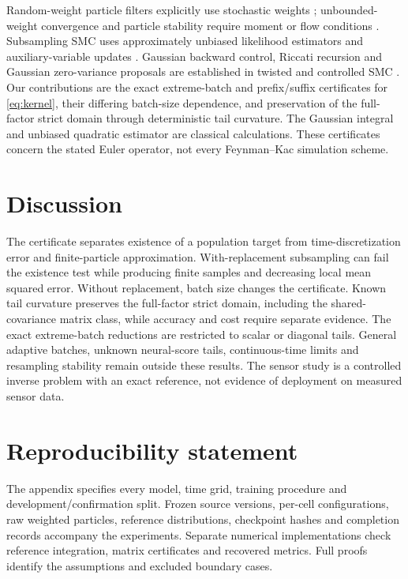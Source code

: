 \documentclass{article}
\begin{document}
Random-weight particle filters explicitly use stochastic weights \citep{fearnhead2010}; unbounded-weight convergence and particle stability require moment or flow conditions \citep{mbalawata2016,whiteley2013}. Subsampling SMC uses approximately unbiased likelihood estimators and auxiliary-variable updates \citep{gunawan2020}. Gaussian backward control, Riccati recursion and Gaussian zero-variance proposals are established in twisted and controlled SMC \citep{whiteley2014,heng2020}. Our contributions are the exact extreme-batch and prefix/suffix certificates for \eqref{eq:kernel}, their differing batch-size dependence, and preservation of the full-factor strict domain through deterministic tail curvature. The Gaussian integral and unbiased quadratic estimator are classical calculations. These certificates concern the stated Euler operator, not every Feynman--Kac simulation scheme.

\section{Discussion}
The certificate separates existence of a population target from time-discretization error and finite-particle approximation. With-replacement subsampling can fail the existence test while producing finite samples and decreasing local mean squared error. Without replacement, batch size changes the certificate. Known tail curvature preserves the full-factor strict domain, including the shared-covariance matrix class, while accuracy and cost require separate evidence. The exact extreme-batch reductions are restricted to scalar or diagonal tails. General adaptive batches, unknown neural-score tails, continuous-time limits and resampling stability remain outside these results. The sensor study is a controlled inverse problem with an exact reference, not evidence of deployment on measured sensor data.

\section*{Reproducibility statement}
The appendix specifies every model, time grid, training procedure and development/confirmation split. Frozen source versions, per-cell configurations, raw weighted particles, reference distributions, checkpoint hashes and completion records accompany the experiments. Separate numerical implementations check reference integration, matrix certificates and recovered metrics. Full proofs identify the assumptions and excluded boundary cases.
\end{document}
